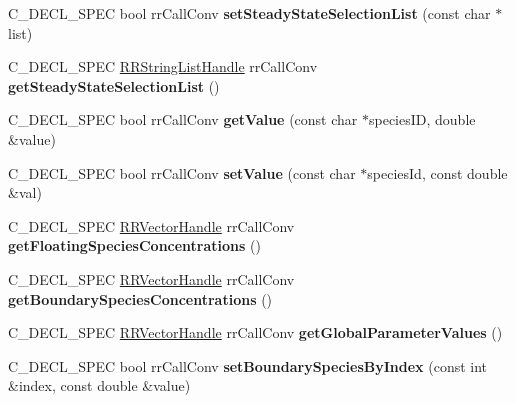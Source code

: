 \begin{DoxyCompactItemize}
\item 
\hypertarget{group__loadsave_ga397a988c31c2010d9f2752080afa8dad}{
\-C\-\_\-\-D\-E\-C\-L\-\_\-\-S\-P\-E\-C bool rr\-Call\-Conv {\bfseries set\-Steady\-State\-Selection\-List} (const char $\ast$list)}
\label{group__loadsave_ga397a988c31c2010d9f2752080afa8dad}

\item 
\hypertarget{group__loadsave_ga29b3868509ef2c09e4bbf0b11b731443}{
\-C\-\_\-\-D\-E\-C\-L\-\_\-\-S\-P\-E\-C \hyperlink{struct_r_r_string_list}{\-R\-R\-String\-List\-Handle} \*
rr\-Call\-Conv {\bfseries get\-Steady\-State\-Selection\-List} ()}
\label{group__loadsave_ga29b3868509ef2c09e4bbf0b11b731443}

\item 
\hypertarget{group__loadsave_ga8c67bc930b33926bccb3c9f810dc2825}{
\-C\-\_\-\-D\-E\-C\-L\-\_\-\-S\-P\-E\-C bool rr\-Call\-Conv {\bfseries get\-Value} (const char $\ast$species\-I\-D, double \&value)}
\label{group__loadsave_ga8c67bc930b33926bccb3c9f810dc2825}

\item 
\hypertarget{group__loadsave_ga8663bcca2b00ef20c13841ca9fc9f56c}{
\-C\-\_\-\-D\-E\-C\-L\-\_\-\-S\-P\-E\-C bool rr\-Call\-Conv {\bfseries set\-Value} (const char $\ast$species\-Id, const double \&val)}
\label{group__loadsave_ga8663bcca2b00ef20c13841ca9fc9f56c}

\item 
\hypertarget{group__loadsave_ga0db8fe5f89985f27ea4ddb3c595b16fd}{
\-C\-\_\-\-D\-E\-C\-L\-\_\-\-S\-P\-E\-C \hyperlink{struct_r_r_vector}{\-R\-R\-Vector\-Handle} \*
rr\-Call\-Conv {\bfseries get\-Floating\-Species\-Concentrations} ()}
\label{group__loadsave_ga0db8fe5f89985f27ea4ddb3c595b16fd}

\item 
\hypertarget{group__loadsave_gaae9b6b75211923bcf6f7196fe707c631}{
\-C\-\_\-\-D\-E\-C\-L\-\_\-\-S\-P\-E\-C \hyperlink{struct_r_r_vector}{\-R\-R\-Vector\-Handle} \*
rr\-Call\-Conv {\bfseries get\-Boundary\-Species\-Concentrations} ()}
\label{group__loadsave_gaae9b6b75211923bcf6f7196fe707c631}

\item 
\hypertarget{group__loadsave_gaf4be0a5e72db408248569a1d3e28c1f0}{
\-C\-\_\-\-D\-E\-C\-L\-\_\-\-S\-P\-E\-C \hyperlink{struct_r_r_vector}{\-R\-R\-Vector\-Handle} \*
rr\-Call\-Conv {\bfseries get\-Global\-Parameter\-Values} ()}
\label{group__loadsave_gaf4be0a5e72db408248569a1d3e28c1f0}

\item 
\hypertarget{group__loadsave_gabb6764fa48d0b3f2ca3b38e391479347}{
\-C\-\_\-\-D\-E\-C\-L\-\_\-\-S\-P\-E\-C bool rr\-Call\-Conv {\bfseries set\-Boundary\-Species\-By\-Index} (const int \&index, const double \&value)}
\label{group__loadsave_gabb6764fa48d0b3f2ca3b38e391479347}


\end{DoxyCompactItemize}

